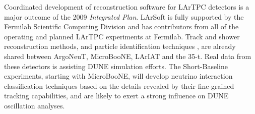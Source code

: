 Coordinated development of reconstruction software for LArTPC detectors is a major outcome of the 2009 \textit{Integrated Plan}.  LArSoft is fully supported by the Fermilab Scientific Computing Division and has contributors from all of the operating and planned LArTPC experiments at Fermilab.  Track and shower reconstruction methods, and particle identification techniques , are already shared between ArgoNeuT, MicroBooNE, LArIAT and the 35-t.  Real data from these detectors is assisting DUNE simulation efforts.  The Short-Baseline experiments, starting with MicroBooNE, will develop neutrino interaction classification techniques based on the details revealed by their fine-grained tracking capabilities, and are likely to exert a strong influence on DUNE oscillation analyses.



 